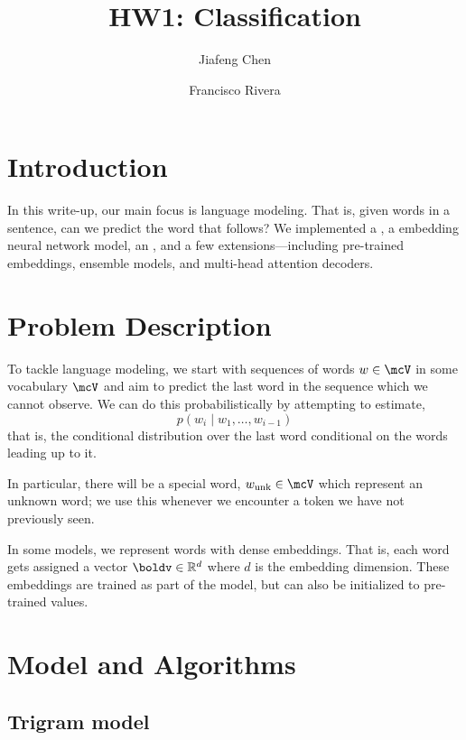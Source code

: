 \documentclass[12pt]{article}
\title{HW1: Classification}
\author{Jiafeng Chen \and
Francisco Rivera}
\begin{document}
\maketitle{}
\section{Introduction}
In this write-up, our main focus is language modeling. That is, given words in a
sentence, can we predict the word that follows? We implemented a
, a embedding neural network model, an
, and a few extensions---including pre-trained embeddings,
ensemble models, and multi-head attention decoders. 

\section{Problem Description}

To tackle language modeling, we start with sequences of words $w \in \mcV$ in
some vocabulary $\mcV$ and aim to predict the last word in the sequence which we
cannot observe. We can do this probabilistically by attempting to estimate,
\begin{equation}
p(w_i \mid w_1, \ldots, w_{i-1})
\label{eq:probabilistic}
\end{equation}
that is, the conditional distribution over the last word conditional on the
words leading up to it.

In particular, there will be a special word, $w_\text{unk} \in \mcV$ which
represent an unknown word; we use this whenever we encounter a token we have not
previously seen. 

In some models, we represent words with dense embeddings. That is, each word
gets assigned a vector $\boldv \in \mathbb{R}^d$ where $d$ is the embedding
dimension. These embeddings are trained as part of the model, but can also be
initialized to pre-trained values.

\section{Model and Algorithms}

\subsection{Trigram model}
\label{subsec:trigram}
\end{document}
